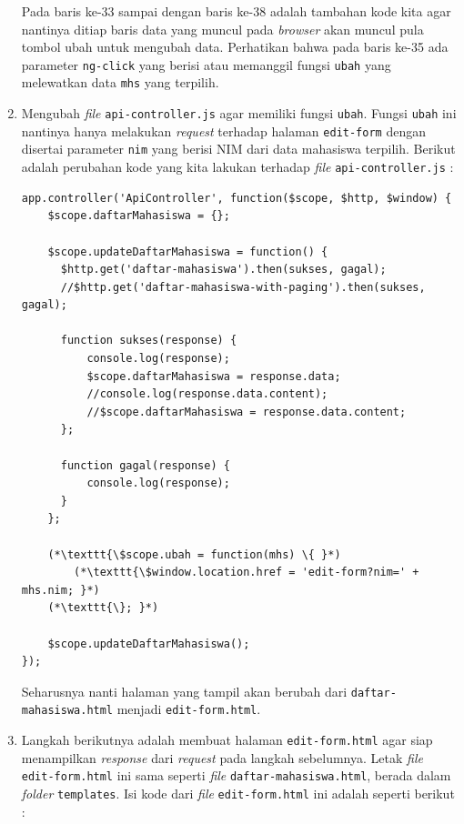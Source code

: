 \begin{enumerate}
	Pada baris ke-33 sampai dengan baris ke-38 adalah tambahan kode kita agar nantinya ditiap baris data yang muncul pada \textit{browser} akan muncul pula tombol ubah untuk mengubah data. Perhatikan bahwa pada baris ke-35 ada parameter \texttt{ng-click} yang berisi atau memanggil fungsi \texttt{ubah} yang melewatkan data \texttt{mhs} yang terpilih.
	
	\item Mengubah \textit{file} \texttt{api-controller.js} agar memiliki fungsi \texttt{ubah}. Fungsi \texttt{ubah} ini nantinya hanya melakukan \textit{request} terhadap halaman \texttt{edit-form} dengan disertai parameter \texttt{nim} yang berisi NIM dari data mahasiswa terpilih. Berikut adalah perubahan kode yang kita lakukan terhadap \textit{file} \texttt{api-controller.js} :
	
	\begin{lstlisting}
app.controller('ApiController', function($scope, $http, $window) {
    $scope.daftarMahasiswa = {};
    
    $scope.updateDaftarMahasiswa = function() {
      $http.get('daftar-mahasiswa').then(sukses, gagal);
      //$http.get('daftar-mahasiswa-with-paging').then(sukses, gagal);
      
      function sukses(response) {
          console.log(response);
          $scope.daftarMahasiswa = response.data;
          //console.log(response.data.content);
          //$scope.daftarMahasiswa = response.data.content;
      };
      
      function gagal(response) {
          console.log(response);
      }
    };
    
    (*\texttt{\$scope.ubah = function(mhs) \{ }*)
        (*\texttt{\$window.location.href = 'edit-form?nim=' + mhs.nim; }*)
    (*\texttt{\}; }*)
    
    $scope.updateDaftarMahasiswa();
});
	\end{lstlisting}
	
	Seharusnya nanti halaman yang tampil akan berubah dari \texttt{daftar-mahasiswa.html} menjadi \texttt{edit-form.html}.
	
	\item Langkah berikutnya adalah membuat halaman \texttt{edit-form.html} agar siap menampilkan \textit{response} dari \textit{request} pada langkah sebelumnya. Letak \textit{file} \texttt{edit-form.html} ini sama seperti \textit{file} \texttt{daftar-mahasiswa.html}, berada dalam \textit{folder} \texttt{templates}. Isi kode dari \textit{file} \texttt{edit-form.html} ini adalah seperti berikut :
	

\end{enumerate}
